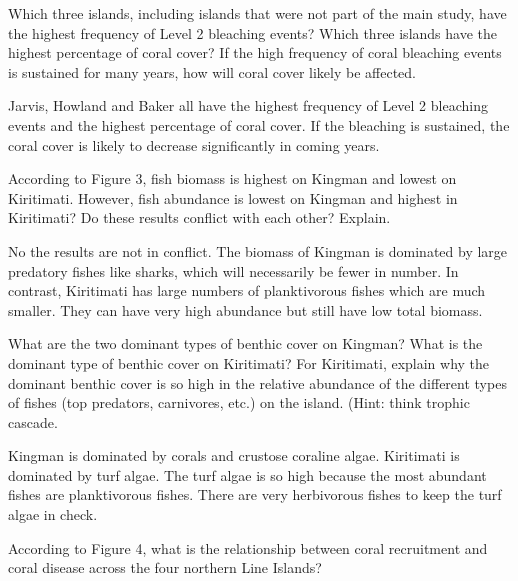 \documentclass[11pt, addpoints]{exam}
\begin{document}
\begin{questions}

\question[5]
Which three islands, including islands that were not part of the main study, have the highest frequency of Level 2 bleaching events? Which three islands have the highest percentage of coral cover? If the high frequency of coral bleaching events is sustained for many years, how will coral cover likely be affected. 

\begin{solution}

Jarvis, Howland and Baker all have the highest frequency of Level 2 bleaching events and the highest percentage of coral cover.  If the bleaching is sustained, the coral cover is likely to decrease significantly in coming years.

\end{solution}

\question[5]
According to Figure 3, fish biomass is highest on Kingman and lowest on Kiritimati. However, fish abundance is lowest on Kingman and highest in Kiritimati? Do these results conflict with each other?  Explain.

\begin{solution}
No the results are not in conflict. The biomass of Kingman is dominated by large predatory fishes like sharks, which will necessarily be fewer in number.  In contrast, Kiritimati has large numbers of planktivorous fishes which are much smaller. They can have very high abundance but still have low total biomass.
\end{solution}

\question[10]
What are the two dominant types of benthic cover on Kingman? What is the dominant type of benthic cover on Kiritimati?  For Kiritimati, explain why the dominant benthic cover is so high in the relative abundance of the different types of fishes (top predators, carnivores, etc.) on the island. (Hint: think trophic cascade.

\begin{solution}
Kingman is dominated by corals and crustose coraline algae. Kiritimati is dominated by turf algae.  The turf algae is so high because the most abundant fishes are planktivorous fishes. There are very herbivorous fishes to keep the turf algae in check.
\end{solution}

\question[5]
According to Figure 4, what is the relationship between coral recruitment and coral disease across the four northern Line Islands?


\end{questions}
\end{document}
